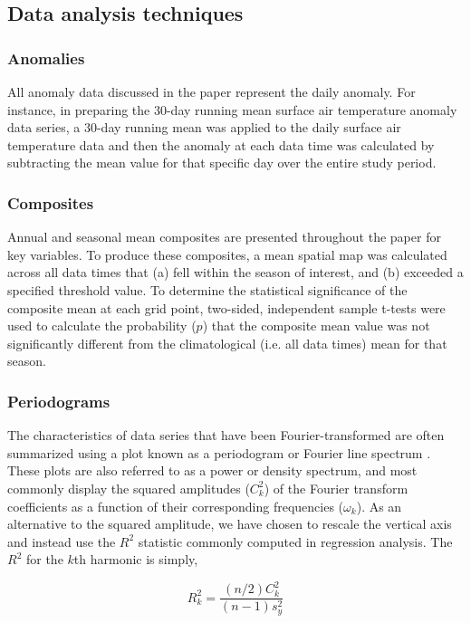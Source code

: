 \subsection{Data analysis techniques}

\subsubsection{Anomalies}
All anomaly data discussed in the paper represent the daily anomaly. For instance, in preparing the 30-day running mean surface air temperature anomaly data series, a 30-day running mean was applied to the daily surface air temperature data and then the anomaly at each data time was calculated by subtracting the mean value for that specific day over the entire study period.

\subsubsection{Composites}
Annual and seasonal mean composites are presented throughout the paper for key variables. To produce these composites, a mean spatial map was calculated across all data times that (a) fell within the season of interest, and (b) exceeded a specified threshold value. To determine the statistical significance of the composite mean at each grid point, two-sided, independent sample t-tests were used to calculate the probability ($p$) that the composite mean value was not significantly different from the climatological (i.e. all data times) mean for that season.

\subsubsection{Periodograms}
The characteristics of data series that have been Fourier-transformed are often summarized using a plot known as a periodogram or Fourier line spectrum \citep{Wilks2011}. These plots are also referred to as a power or density spectrum, and most commonly display the squared amplitudes ($C_k^2$) of the Fourier transform coefficients as a function of their corresponding frequencies ($\omega_k$). As an alternative to the squared amplitude, we have chosen to rescale the vertical axis and instead use the $R^2$ statistic commonly computed in regression analysis. The $R^2$ for the $k$th harmonic is simply,

\begin{equation}\label{eq:variance_explained}
R_k^2 = \frac{(n/2)C_k^2}{(n-1)s_y^2}
\end{equation}

